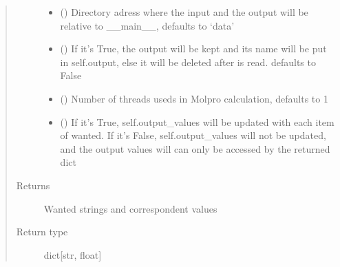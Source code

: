 \documentclass[letterpaper,10pt,english]{sphinxmanual}
\begin{document}
\begin{fulllineitems}
\begin{fulllineitems}
\begin{quote}
\begin{description}
\begin{itemize}
\item {} 
\sphinxAtStartPar
{} (\sphinxstyleliteralemphasis{\sphinxupquote{, }}) \textendash{} Directory adress where the input and the output will be relative to \_\_main\_\_, defaults to
‘data’

\item {} 
\sphinxAtStartPar
{} (\sphinxstyleliteralemphasis{\sphinxupquote{, }}) \textendash{} If it’s True, the output will be kept and its name will be put in self.output, else it will
be deleted after is read. defaults to False

\item {} 
\sphinxAtStartPar
{} (\sphinxstyleliteralemphasis{\sphinxupquote{, }}) \textendash{} Number of threads useds in Molpro calculation, defaults to 1

\item {} 
\sphinxAtStartPar
{} (\sphinxstyleliteralemphasis{\sphinxupquote{, }}) \textendash{} If it’s True, self.output\_values will be updated with each item of wanted. If it’s False,
self.output\_values will not be updated, and the output values will can only be accessed by the returned dict

\end{itemize}

\item[{Returns}] \leavevmode
\sphinxAtStartPar
Wanted strings and correspondent values

\item[{Return type}] \leavevmode
\sphinxAtStartPar
dict{[}str, float{]}

\end{description}\end{quote}

\end{fulllineitems}



\end{fulllineitems}
\end{document}
